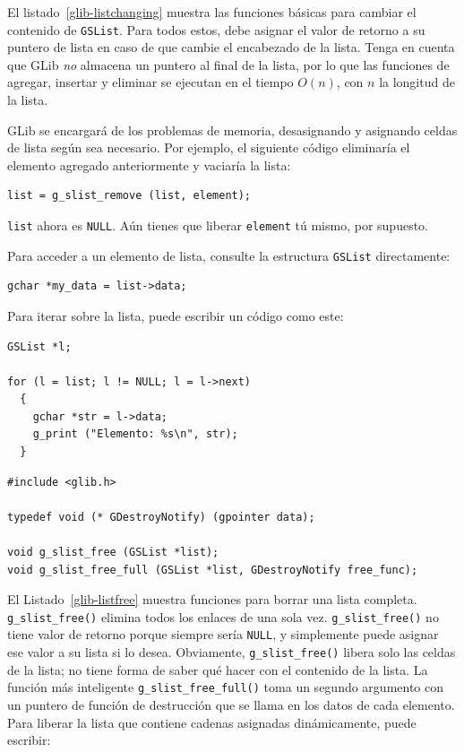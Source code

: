 El listado~\ref{glib-listchanging} muestra las funciones básicas para cambiar el contenido de \lstinline{GSList}. Para todos estos, debe asignar el valor de retorno a su puntero de lista en caso de que cambie el encabezado de la lista. Tenga en cuenta que GLib \emph{no} almacena un puntero al final de la lista, por lo que las funciones de agregar, insertar y eliminar se ejecutan en el tiempo $O(n)$, con $n$ la longitud de la lista.

GLib se encargará de los problemas de memoria, desasignando y asignando celdas de lista según sea necesario. Por ejemplo, el siguiente código eliminaría el elemento agregado anteriormente y vaciaría la lista:

\begin{lstlisting}[style=GLib/GTK]
list = g_slist_remove (list, element);
\end{lstlisting}

\lstinline{list} ahora es \lstinline{NULL}. Aún tienes que liberar \lstinline{element} tú mismo, por supuesto.

Para acceder a un elemento de lista, consulte la estructura \lstinline{GSList} directamente:

\begin{lstlisting}[style=GLib/GTK]
gchar *my_data = list->data;
\end{lstlisting}

Para iterar sobre la lista, puede escribir un código como este:

\begin{lstlisting}[style=GLib/GTK]
GSList *l;

for (l = list; l != NULL; l = l->next)
  {
    gchar *str = l->data;
    g_print ("Elemento: %s\n", str);
  }
\end{lstlisting}

\begin{lstlisting}[style=GLib/GTK, caption={Liberar listas enteras vinculadas}, label=glib-listfree]
#include <glib.h>

typedef void (* GDestroyNotify) (gpointer data);

void g_slist_free (GSList *list);
void g_slist_free_full (GSList *list, GDestroyNotify free_func);
\end{lstlisting}

El Listado~\ref{glib-listfree} muestra funciones para borrar una lista completa. \lstinline{g_slist_free()} elimina todos los enlaces de una sola vez. \lstinline{g_slist_free()} no tiene valor de retorno porque siempre sería \lstinline{NULL}, y simplemente puede asignar ese valor a su lista si lo desea. Obviamente, \lstinline{g_slist_free()} libera solo las celdas de la lista; no tiene forma de saber qué hacer con el contenido de la lista. La función más inteligente \lstinline{g_slist_free_full()} toma un segundo argumento con un puntero de función de destrucción que se llama en los datos de cada elemento. Para liberar la lista que contiene cadenas asignadas dinámicamente, puede escribir:

